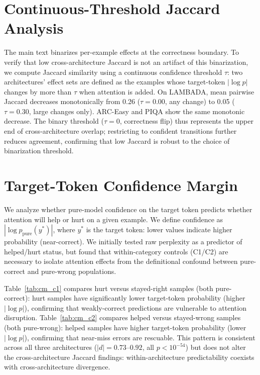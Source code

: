 \section{Continuous-Threshold Jaccard Analysis}\label{app:continuous_jaccard}

The main text binarizes per-example effects at the correctness boundary. To verify that low cross-architecture Jaccard is not an artifact of this binarization, we compute Jaccard similarity using a continuous confidence threshold $\tau$: two architectures' effect sets are defined as the examples whose target-token $|\log p|$ changes by more than $\tau$ when attention is added. On LAMBADA, mean pairwise Jaccard decreases monotonically from 0.26 ($\tau = 0.00$, any change) to 0.05 ($\tau = 0.30$, large changes only). ARC-Easy and PIQA show the same monotonic decrease. The binary threshold ($\tau = 0$, correctness flip) thus represents the upper end of cross-architecture overlap; restricting to confident transitions further reduces agreement, confirming that low Jaccard is robust to the choice of binarization threshold.

\section{Target-Token Confidence Margin}
\label{app:confidence_margin}

We analyze whether pure-model confidence on the target token predicts whether attention will help or hurt on a given example.
We define confidence as $|\log p_{\text{pure}}(y^*)|$, where $y^*$ is the target token: lower values indicate higher probability (near-correct).
We initially tested raw perplexity as a predictor of helped/hurt status, but found that within-category controls (C1/C2) are necessary to isolate attention effects from the definitional confound between pure-correct and pure-wrong populations.

Table~\ref{tab:cm_c1} compares hurt versus stayed-right samples (both pure-correct): hurt samples have significantly lower target-token probability (higher $|\log p|$), confirming that weakly-correct predictions are vulnerable to attention disruption.
Table~\ref{tab:cm_c2} compares helped versus stayed-wrong samples (both pure-wrong): helped samples have higher target-token probability (lower $|\log p|$), confirming that near-miss errors are rescuable.
This pattern is consistent across all three architectures ($|d| = 0.73$--$0.92$, all $p < 10^{-54}$) but does not alter the cross-architecture Jaccard findings: within-architecture predictability coexists with cross-architecture divergence.

